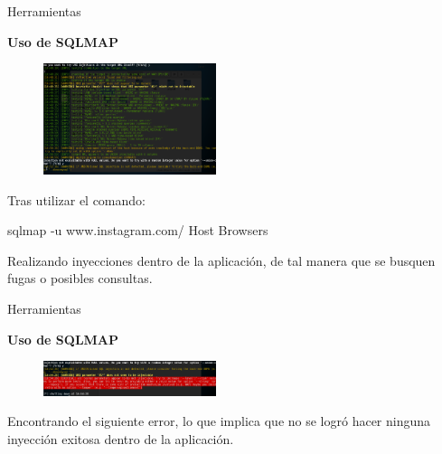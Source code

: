 \begin{frame}[t,fragile]{Herramientas}

\textbf{Uso de SQLMAP}

\begin{figure} 
\vspace{2pt}
  \begin{center}
    \includegraphics[width=0.45\textwidth]{testsqlmap.png}
    \label{fig:databaseUserTable}
  \end{center}
  \vspace{2pt}
\end{figure} 

\bigskip

 Tras utilizar el comando:
 
 \begin{center}
     sqlmap -u www.instagram.com/ Host Browsers 
 \end{center}
 
 Realizando inyecciones dentro de la aplicación, de tal manera que se busquen fugas o posibles consultas. 

\end{frame}


\begin{frame}[t,fragile]{Herramientas}

\textbf{Uso de SQLMAP}

\begin{figure} 
\vspace{2pt}
  \begin{center}
    \includegraphics[width=0.45\textwidth]{errortest.png}
    \label{fig:databaseUserTable}
  \end{center}
  \vspace{2pt}
\end{figure} 

\bigskip

 Encontrando el siguiente error, lo que implica que no se logró hacer ninguna inyección exitosa dentro de la aplicación.

\end{frame}

